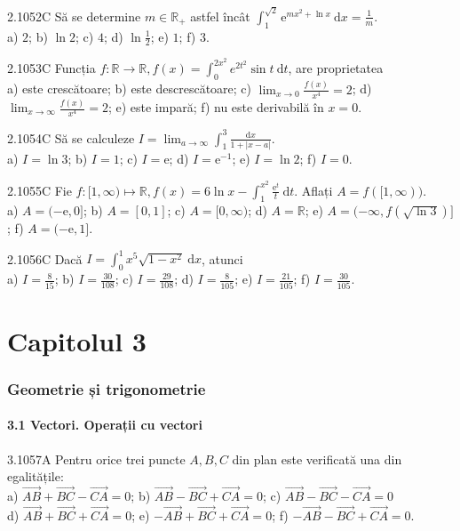 \documentclass[11pt]{article}
\begin{document}
2.1052C Să se determine $m \in \mathbb{R}_{+}$ astfel încât $\int_{1}^{\sqrt{2}} \mathrm{e}^{m x^{2}+\ln x} \mathrm{~d} x=\frac{1}{m}$.\\ a) $2$; b) $\ln 2$; c) $4$; d) $\ln \frac{1}{2}$; e) $1$; f) $3$.

2.1053C Funcția $f: \mathbb{R} \rightarrow \mathbb{R}, f(x)=\int_{0}^{2 x^{2}} e^{2 t^{2}} \sin t \mathrm{~d} t$, are proprietatea\\ a) este crescătoare; b) este descrescătoare; c) $\lim _{x \rightarrow 0} \frac{f(x)}{x^{4}}=2$; d) $\lim _{x \rightarrow \infty} \frac{f(x)}{x^{4}}=2$; e) este impară; f) nu este derivabilă în $x=0$.

2.1054C Să se calculeze $I=\lim _{a \rightarrow \infty} \int_{1}^{3} \frac{\mathrm{d} x}{1+|x-a|}$.\\ a) $I=\ln 3$; b) $I=1$; c) $I=\mathrm{e}$; d) $I=\mathrm{e}^{-1}$; e) $I=\ln 2$; f) $I=0$.

2.1055C Fie $f:[1, \infty) \mapsto \mathbb{R}, f(x)=6 \ln x-\int_{1}^{x^{2}} \frac{\mathrm{e}^{t}}{t} \mathrm{~d} t$. Aflați $A=f([1, \infty))$.\\ a) $A=(-\mathrm{e}, 0]$; b) $A=[0,1]$; c) $A=[0, \infty)$; d) $A=\mathbb{R}$; e) $A=(-\infty, f(\sqrt{\ln 3})]$; f) $A=(-\mathrm{e},1]$.

2.1056C Dacă $I=\int_{0}^{1} x^{5} \sqrt{1-x^{2}} \mathrm{~d} x$, atunci\\ a) $I=\frac{8}{15}$; b) $I=\frac{30}{108}$; c) $I=\frac{29}{108}$; d) $I=\frac{8}{105}$; e) $I=\frac{21}{105}$; f) $I=\frac{30}{105}$.

\part*{Capitolul 3}
\section*{Geometrie și trigonometrie}
\subsection*{3.1 Vectori. Operații cu vectori}
3.1057A Pentru orice trei puncte $A, B, C$ din plan este verificată una din egalitățile:\\ a) $\overrightarrow{A B}+\overrightarrow{B C}-\overrightarrow{C A}=0$; b) $\overrightarrow{A B}-\overrightarrow{B C}+\overrightarrow{C A}=0$; c) $\overrightarrow{A B}-\overrightarrow{B C}-\overrightarrow{C A}=0$\\ d) $\overrightarrow{A B}+\overrightarrow{B C}+\overrightarrow{C A}=0$; e) $-\overrightarrow{A B}+\overrightarrow{B C}+\overrightarrow{C A}=0$; f) $-\overrightarrow{A B}-\overrightarrow{B C}+\overrightarrow{C A}=0$.
\end{document}
